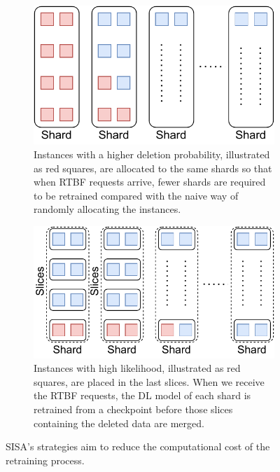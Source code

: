 \begin{figure}[htbp]
  \centering
  \begin{subfigure}[b]{0.235\textwidth}
         \centering
  \includegraphics[width=0.95\linewidth]{assets/shidong-sisa-sharding.pdf}
  \caption{Instances with a higher deletion probability, illustrated as red squares, are allocated to the same shards so that when RTBF requests arrive, fewer shards are required to be retrained compared with the naive way of randomly allocating the instances.}
  \label{fig:sisa-sharding}
  \end{subfigure}
  \hspace{0.5mm}
  \begin{subfigure}[b]{0.235\textwidth}
  \centering
  \includegraphics[width=\linewidth]{assets/shidong-sisa-slicing.pdf}
  \caption{Instances with high likelihood, illustrated as red squares, are placed in the last slices. When we receive the RTBF requests, the DL model of each shard is retrained from a checkpoint before those slices containing the deleted data are merged. 
  }
  
  \label{fig:sisa-slicing}
    \end{subfigure}
   \caption{SISA's strategies aim to reduce the computational cost of the retraining process.}
\end{figure}


